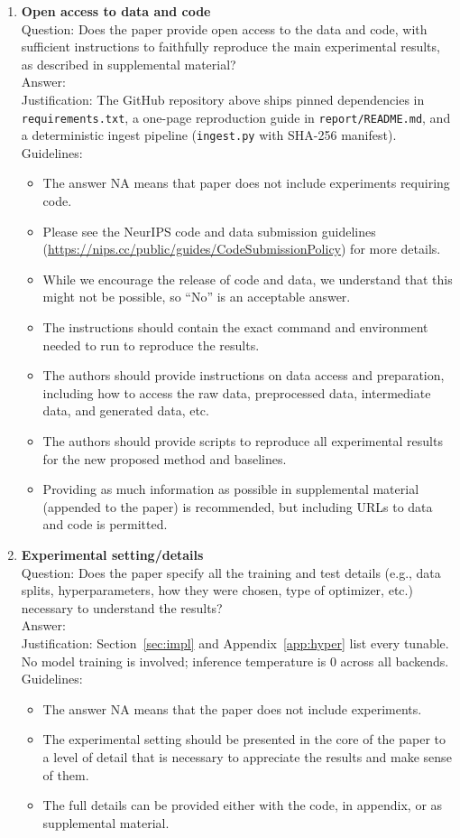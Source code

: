 \documentclass{article}
\begin{document}
\begin{enumerate}
\item {\bf Open access to data and code}\\
Question: Does the paper provide open access to the data and code, with sufficient instructions to faithfully reproduce the main experimental results, as described in supplemental material?\\
Answer: \answerYes{}\\
Justification: The GitHub repository above ships pinned dependencies in \texttt{requirements.txt}, a one-page reproduction guide in \texttt{report/README.md}, and a deterministic ingest pipeline (\texttt{ingest.py} with SHA-256 manifest).\\
Guidelines:
\begin{itemize}
\item The answer NA means that paper does not include experiments requiring code.
\item Please see the NeurIPS code and data submission guidelines (\url{https://nips.cc/public/guides/CodeSubmissionPolicy}) for more details.
\item While we encourage the release of code and data, we understand that this might not be possible, so ``No'' is an acceptable answer.
\item The instructions should contain the exact command and environment needed to run to reproduce the results.
\item The authors should provide instructions on data access and preparation, including how to access the raw data, preprocessed data, intermediate data, and generated data, etc.
\item The authors should provide scripts to reproduce all experimental results for the new proposed method and baselines.
\item Providing as much information as possible in supplemental material (appended to the paper) is recommended, but including URLs to data and code is permitted.
\end{itemize}

\item {\bf Experimental setting/details}\\
Question: Does the paper specify all the training and test details (e.g., data splits, hyperparameters, how they were chosen, type of optimizer, etc.) necessary to understand the results?\\
Answer: \answerYes{}\\
Justification: Section~\ref{sec:impl} and Appendix~\ref{app:hyper} list every tunable. No model training is involved; inference temperature is 0 across all backends.\\
Guidelines:
\begin{itemize}
\item The answer NA means that the paper does not include experiments.
\item The experimental setting should be presented in the core of the paper to a level of detail that is necessary to appreciate the results and make sense of them.
\item The full details can be provided either with the code, in appendix, or as supplemental material.
\end{itemize}


\end{enumerate}
\end{document}
